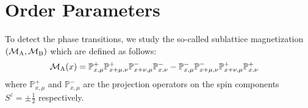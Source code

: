 \documentclass[12pt, a4paper, twoside, titlepage]{article}
\newcommand{\M}[1]{\ensuremath{\mathcal{M}_{\rm #1}}}
\newcommand{\Pp}[1]{\ensuremath{\mathbb{P}^{+}_{#1}}}
\newcommand{\Pm}[1]{\ensuremath{\mathbb{P}^{-}_{#1}}}
\begin{document}
\section{Order Parameters}
 To detect the phase transitions, we study the so-called sublattice 
 magnetization $( \M{A}, \M{B})$ which are defined as follows:
 \begin{align}
	 \M{A}(x) &= \Pp{x,\mu} \Pp{x+\mu,\nu} \Pm{x+\nu,\mu} \Pm{x,\nu} - 
          \Pm{x,\mu} \Pm{x+\mu,\nu} \Pp{x+\nu,\mu} \Pp{x,\nu} 
 \end{align}
 where $\Pp{x,\mu}$ and $\Pm{x,\mu}$ are the projection operators
 on the spin components $S^z = \pm \frac{1}{2}$ respectively.


\end{document}
